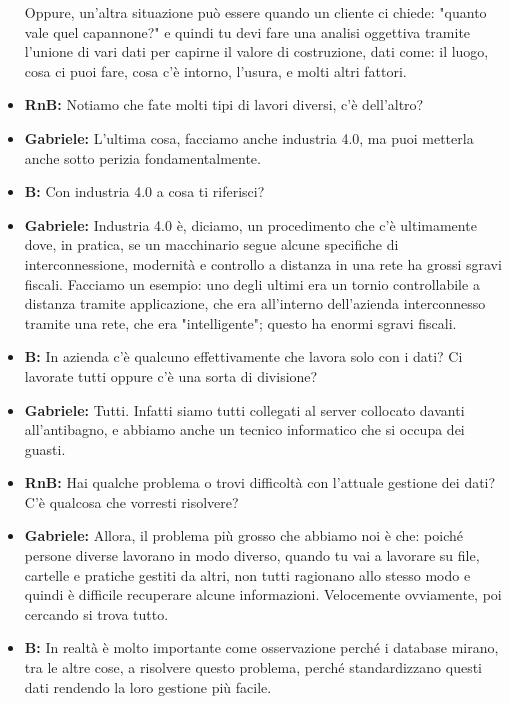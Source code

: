 \documentclass{elegantbook}
\begin{document}
\begin{itemize}
                    Oppure, un'altra situazione può essere quando un cliente ci chiede: "quanto vale quel capannone?" e quindi tu devi fare una analisi oggettiva tramite 
                    l'unione di vari dati per capirne il valore di costruzione, dati come: il luogo, cosa ci puoi fare, cosa c'è intorno, l'usura, e molti altri fattori.
		\item\textbf{RnB}\textbf{:} Notiamo che fate molti tipi di lavori diversi, c'è dell'altro?
		\item\textbf{Gabriele}\textbf{:} L'ultima cosa, facciamo anche industria 4.0, ma puoi metterla anche sotto perizia fondamentalmente.
		\item\textbf{B}\textbf{:} Con industria 4.0 a cosa ti riferisci?
		\item\textbf{Gabriele}\textbf{:} Industria 4.0 è, diciamo, un procedimento che c'è ultimamente dove, in pratica, se un macchinario segue alcune specifiche
                    di interconnessione, modernità e controllo a distanza in una rete ha grossi sgravi fiscali. Facciamo un esempio: uno degli ultimi era un tornio
                    controllabile a distanza tramite applicazione, che era all'interno dell'azienda interconnesso tramite una rete, che era "intelligente"; questo ha enormi
                    sgravi fiscali.
		\item\textbf{B}\textbf{:} In azienda c'è qualcuno effettivamente che lavora solo con i dati? Ci lavorate tutti oppure c'è una sorta di divisione?
		\item\textbf{Gabriele}\textbf{:} Tutti. Infatti siamo tutti collegati al server collocato davanti all'antibagno, e abbiamo anche un tecnico informatico che
                    si occupa dei guasti.
		\item\textbf{RnB}\textbf{:} Hai qualche problema o trovi difficoltà con l'attuale gestione dei dati? C'è qualcosa che vorresti risolvere? 
		\item\textbf{Gabriele}\textbf{:} Allora, il problema più grosso che abbiamo noi è che: poiché persone diverse lavorano in modo diverso, quando tu vai a 
                    lavorare su file, cartelle e pratiche gestiti da altri, non tutti ragionano allo stesso modo e quindi è difficile recuperare alcune informazioni. 
                    Velocemente ovviamente, poi cercando si trova tutto.
		\item\textbf{B}\textbf{:} In realtà è molto importante come osservazione perché i database mirano, tra le altre cose, a risolvere questo problema, perché
                    standardizzano questi dati rendendo la loro gestione più facile.

\end{itemize}
\end{document}

